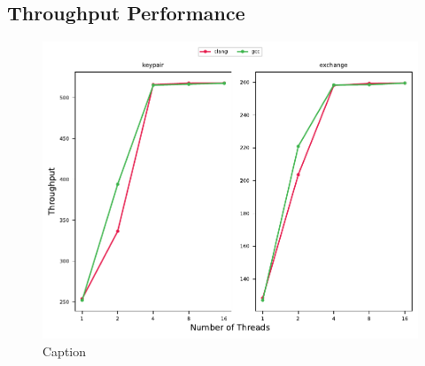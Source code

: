 
\subsection{Throughput Performance}

\begin{figure}
    \centering
    \includegraphics{chapters/results/throughput/Old Mid-Range Laptop_dh.pdf}
    \caption{Caption}
    \label{figure:results:throughput:dh-old-mid-range-laptop}
\end{figure}

